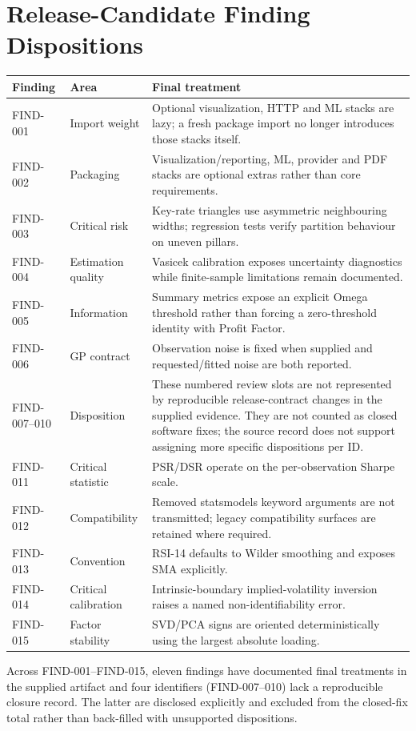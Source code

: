 \documentclass{asrpaper}
\begin{document}
\section{Release-Candidate Finding Dispositions}
\begin{center}\scriptsize
\begin{tabularx}{\linewidth}{@{}p{.15\linewidth}p{.20\linewidth}X@{}}
\toprule
\textbf{Finding} & \textbf{Area} & \textbf{Final treatment} \\
\midrule
FIND-001 & Import weight & Optional visualization, HTTP and ML stacks are lazy; a fresh package import no longer introduces those stacks itself. \\
FIND-002 & Packaging & Visualization/reporting, ML, provider and PDF stacks are optional extras rather than core requirements. \\
FIND-003 & Critical risk & Key-rate triangles use asymmetric neighbouring widths; regression tests verify partition behaviour on uneven pillars. \\
FIND-004 & Estimation quality & Vasicek calibration exposes uncertainty diagnostics while finite-sample limitations remain documented. \\
FIND-005 & Information & Summary metrics expose an explicit Omega threshold rather than forcing a zero-threshold identity with Profit Factor. \\
FIND-006 & GP contract & Observation noise is fixed when supplied and requested/fitted noise are both reported. \\
FIND-007--010 & Disposition & These numbered review slots are not represented by reproducible release-contract changes in the supplied evidence. They are not counted as closed software fixes; the source record does not support assigning more specific dispositions per ID. \\
FIND-011 & Critical statistic & PSR/DSR operate on the per-observation Sharpe scale. \\
FIND-012 & Compatibility & Removed statsmodels keyword arguments are not transmitted; legacy compatibility surfaces are retained where required. \\
FIND-013 & Convention & RSI-14 defaults to Wilder smoothing and exposes SMA explicitly. \\
FIND-014 & Critical calibration & Intrinsic-boundary implied-volatility inversion raises a named non-identifiability error. \\
FIND-015 & Factor stability & SVD/PCA signs are oriented deterministically using the largest absolute loading. \\
\bottomrule
\end{tabularx}
\end{center}
Across FIND-001--FIND-015, eleven findings have documented final treatments in the supplied artifact and four identifiers (FIND-007--010) lack a reproducible closure record. The latter are disclosed explicitly and excluded from the closed-fix total rather than back-filled with unsupported dispositions.
\end{document}
